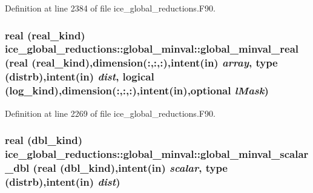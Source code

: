 Definition at line 2384 of file ice\_\-global\_\-reductions.F90.\hypertarget{interfaceice__global__reductions_1_1global__minval_a2aaeb20a8f6fbc34ea7cdb3271067215}{
\subsubsection[{global\_\-minval\_\-real}]{\setlength{\rightskip}{0pt plus 5cm}real (real\_\-kind) ice\_\-global\_\-reductions::global\_\-minval::global\_\-minval\_\-real (real (real\_\-kind),dimension(:,:,:),intent(in) {\em array}, \/  type ({\bf distrb}),intent(in) {\em dist}, \/  logical (log\_\-kind),dimension(:,:,:),intent(in),optional {\em lMask})}}
\label{interfaceice__global__reductions_1_1global__minval_a2aaeb20a8f6fbc34ea7cdb3271067215}


Definition at line 2269 of file ice\_\-global\_\-reductions.F90.\hypertarget{interfaceice__global__reductions_1_1global__minval_aa7816ee9fea9a15890a95db860825a90}{
\subsubsection[{global\_\-minval\_\-scalar\_\-dbl}]{\setlength{\rightskip}{0pt plus 5cm}real (dbl\_\-kind) ice\_\-global\_\-reductions::global\_\-minval::global\_\-minval\_\-scalar\_\-dbl (real (dbl\_\-kind),intent(in) {\em scalar}, \/  type ({\bf distrb}),intent(in) {\em dist})}}
\label{interfaceice__global__reductions_1_1global__minval_aa7816ee9fea9a15890a95db860825a90}


